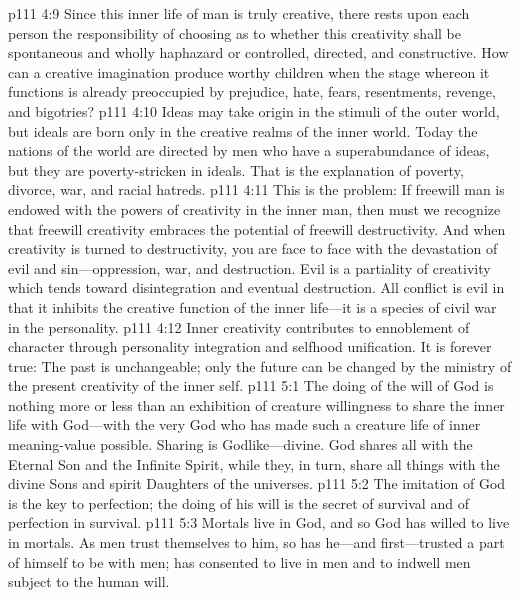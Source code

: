 \vs p111 4:9 Since this inner life of man is truly creative, there rests upon each person the responsibility of choosing as to whether this creativity shall be spontaneous and wholly haphazard or controlled, directed, and constructive. How can a creative imagination produce worthy children when the stage whereon it functions is already preoccupied by prejudice, hate, fears, resentments, revenge, and bigotries?
\vs p111 4:10 Ideas may take origin in the stimuli of the outer world, but ideals are born only in the creative realms of the inner world. Today the nations of the world are directed by men who have a superabundance of ideas, but they are poverty\hyp{}stricken in ideals. That is the explanation of poverty, divorce, war, and racial hatreds.
\vs p111 4:11 This is the problem: If freewill man is endowed with the powers of creativity in the inner man, then must we recognize that freewill creativity embraces the potential of freewill destructivity. And when creativity is turned to destructivity, you are face to face with the devastation of evil and sin---oppression, war, and destruction. Evil is a partiality of creativity which tends toward disintegration and eventual destruction. All conflict is evil in that it inhibits the creative function of the inner life---it is a species of civil war in the personality.
\pc \vs p111 4:12 Inner creativity contributes to ennoblement of character through personality integration and selfhood unification. It is forever true: The past is unchangeable; only the future can be changed by the ministry of the present creativity of the inner self.
%
\vs p111 5:1 The doing of the will of God is nothing more or less than an exhibition of creature willingness to share the inner life with God---with the very God who has made such a creature life of inner meaning\hyp{}value possible. Sharing is Godlike---divine. God shares all with the Eternal Son and the Infinite Spirit, while they, in turn, share all things with the divine Sons and spirit Daughters of the universes.
\vs p111 5:2 The imitation of God is the key to perfection; the doing of his will is the secret of survival and of perfection in survival.
\vs p111 5:3 Mortals live in God, and so God has willed to live in mortals. As men trust themselves to him, so has he---and first---trusted a part of himself to be with men; has consented to live in men and to indwell men subject to the human will.
